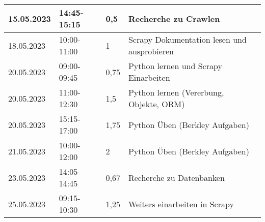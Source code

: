\begin{flushleft}
\begin{longtable}{p{2cm}p{}p{2cm}p{}}
    			15.05.2023 & 14:45-15:15 & 0,5 & Recherche zu Crawlen\\ \midrule
    			18.05.2023 & 10:00-11:00 & 1 & Scrapy Dokumentation lesen und ausprobieren\\ \midrule
    			20.05.2023 & 09:00-09:45 & 0,75 & Python lernen und Scrapy Einarbeiten\\ \midrule
    			20.05.2023 & 11:00-12:30 & 1,5 & Python lernen (Vererbung, Objekte, ORM)\\ \midrule
    			20.05.2023 & 15:15-17:00 & 1,75 & Python Üben (Berkley Aufgaben)\\ \midrule
    			21.05.2023 & 10:00-12:00 & 2 & Python Üben (Berkley Aufgaben)\\ \midrule
			23.05.2023 & 14:05-14:45 & 0,67 & Recherche zu Datenbanken\\ \midrule
			25.05.2023 & 09:15-10:30 & 1,25 & Weiters einarbeiten in Scrapy\\ \midrule

            \bottomrule
    \end{longtable}
\end{flushleft}